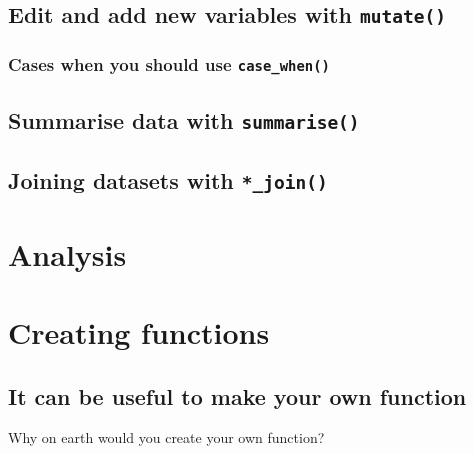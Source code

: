 \documentclass[]{book}
\begin{document}
\hypertarget{edit-and-add-new-variables-with-mutate}{%
\section{\texorpdfstring{Edit and add new variables with \texttt{mutate()}}{Edit and add new variables with mutate()}}\label{edit-and-add-new-variables-with-mutate}}

\hypertarget{cases-when-you-should-use-case_when}{%
\subsection{\texorpdfstring{Cases when you should use \texttt{case\_when()}}{Cases when you should use case\_when()}}\label{cases-when-you-should-use-case_when}}

\hypertarget{summarise-data-with-summarise}{%
\section{\texorpdfstring{Summarise data with \texttt{summarise()}}{Summarise data with summarise()}}\label{summarise-data-with-summarise}}

\hypertarget{joining-datasets-with-_join}{%
\section{\texorpdfstring{Joining datasets with \texttt{*\_join()}}{Joining datasets with *\_join()}}\label{joining-datasets-with-_join}}

\hypertarget{analysis}{%
\chapter{Analysis}\label{analysis}}

\hypertarget{creating-functions}{%
\chapter{Creating functions}\label{creating-functions}}

\hypertarget{it-can-be-useful-to-make-your-own-function}{%
\section{It can be useful to make your own function}\label{it-can-be-useful-to-make-your-own-function}}

Why on earth would you create your own function?
\end{document}
